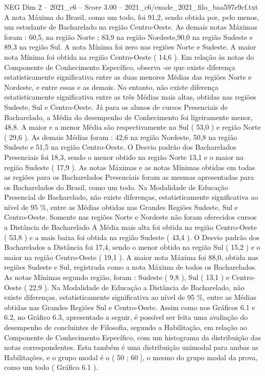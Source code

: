 \begin{textsample}{NEG Dim 2 – 2021\_c6 – Score 3.00 – 2021\_c6/enade\_2021\_filo\_baa597e9cf.txt}
A nota Máxima do Brasil, como um todo, foi 91,2, sendo obtida por, pelo menos, um estudante de Bacharelado na região Centro-Oeste.
As demais notas Máximas foram : 60,5, na região Norte ; 83,9 na região Nordeste,90,0 na região Sudeste e 89,3 na região Sul.
A nota Mínima foi zero nas regiões Norte e Sudeste.
A maior nota Mínima foi obtida na região Centro-Oeste ( 14,6 ).
Em relação às notas do Componente de Conhecimento Específico, observa -se que existe diferença estatisticamente significativa entre as duas menores Médias das regiões Norte e Nordeste, e entre essas e as demais.
No entanto, não existe diferença estatisticamente significativa entre as três Médias mais altas, obtidas nas regiões Sudeste, Sul e Centro-Oeste.
Já para os alunos de cursos Presenciais de Bacharelado, a Média do desempenho de Conhecimento foi ligeiramente menor, 48,8.
A maior e a menor Média são respectivamente na Sul ( 53,0 ) e região Norte ( 29,6 ).
As demais Médias foram : 42,6 na região Nordeste, 50,8 na região Sudeste e 51,5 na região Centro-Oeste.
O Desvio padrão dos Bacharelados Presenciais foi 18,3, sendo o menor obtido na região Norte 13,1 e o maior na região Sudeste ( 17,9 ).
As notas Máximas e as notas Mínimas obtidas em todas as regiões para os Bacharelados Presenciais foram as mesmas apresentadas para os Bacharelados do Brasil, como um todo.
Na Modalidade de Educação Presencial de Bacharelado, não existe diferenças, estatisticamente significativa ao nível de 95 \%, entre as Médias obtidas nas Grandes Regiões Sudeste, Sul e Centro-Oeste.
Somente nas regiões Norte e Nordeste não foram oferecidos cursos a Distância de Bacharelado A Média mais alta foi obtida na região Centro-Oeste ( 53,8 ) e a mais baixa foi obtida na região Sudeste ( 43,4 ).
O Desvio padrão dos Bacharelados a Distância foi 17,4, sendo o menor obtido na região Sul ( 15,2 ) e o maior na região Centro-Oeste ( 19,1 ).
A maior nota Máxima foi 88,0, obtida nas regiões Sudeste e Sul, registrada como a nota Máxima de todos os Bacharelados.
As notas Mínimas segundo região, foram : Sudeste ( 9,8 ), Sul ( 13,1 ) e Centro-Oeste ( 22,9 ).
Na Modalidade de Educação a Distância de Bacharelado, não existe diferenças, estatisticamente significativa ao nível de 95 \%, entre as Médias obtidas nas Grandes Regiões Sul e Centro-Oeste.
Assim como nos Gráficos 6.1 e 6.2, no Gráfico 6.3, apresentado a seguir, é possível ser feita uma avaliação do desempenho de concluintes de Filosofia, segundo a Habilitação, em relação ao Componente de Conhecimento Específico, com um histograma da distribuição das notas correspondentes.
Esta também é uma distribuição unimodal para ambas as Habilitações, e o grupo modal é o ( 50 ; 60 ], o mesmo do grupo modal da prova, como um todo ( Gráfico 6.1 ).

\end{textsample}
